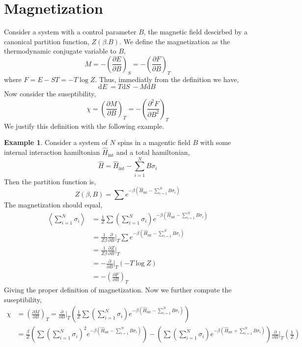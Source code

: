 \documentclass[12pt]{extarticle}
\renewcommand{\d}[1]{ \mathrm{d}#1 \:}
\newcommand{\pderiv}[2]{\frac{\partial{#1}}{\partial{#2}}}
\theoremstyle{definition}
\newtheorem{example}[theorem]{Example}
\begin{document}
\section{Magnetization}

Consider a system with a control parameter $B$, the magnetic field descirbed by a canonical partition function, $Z(\beta. B)$. We define the magnetization as the thermodynamic conjugate variable to $B$,
\[ M = - \left( \pderiv{E}{B} \right)_S = - \left( \pderiv{F}{B} \right)_T \]
where $F = E - ST = - T \log{Z}$. Thus, immediatly from the definition we have,
\[ \d{E} = T \d{S} - M \d{B} \]
Now consider the suseptibility, 
\[ \chi = \left( \pderiv{M}{B} \right)_T = - \left( \frac{\partial^2 F}{\partial B^2} \right)_T \]
We justify this definition with the following example.

\begin{example}
Consider a system of $N$ spins in a magentic field $B$ with some internal interaction hamiltonian $\hat{H}_{\text{int}}$ and a total hamiltonian,
\[ \hat{H} = \hat{H}_{\text{int}} - \sum_{i = 1}^N B \sigma_i \]
Then the partition function is,
\[ Z(\beta, B) = \sum e^{- \beta (\hat{H}_{\text{int}} - \sum\limits_{i = 1}^N B \sigma_i) } \]
The magnetization should equal,
\begin{align*}
\left< \sum_{i = 1}^N \sigma_i \right> & = \frac{1}{Z} \sum \left( \sum_{i = 1}^N \sigma_i \right) e^{- \beta (\hat{H}_{\text{int}} - \sum\limits_{i = 1}^N B \sigma_i) }
\\
& = \frac{1}{Z \beta} \pderiv{}{B} \bigg|_T \sum e^{- \beta (\hat{H}_{\text{int}} - \sum\limits_{i = 1}^N B \sigma_i) }
\\
& = \frac{1}{Z \beta} \pderiv{Z}{B} \bigg|_T
\\
& = - \pderiv{}{B} \bigg|_T (- T \log{Z} )
\\
& = - \left( \pderiv{F}{B} \right)_T
\end{align*}
Giving the proper definition of magnetization. Now we further compute the suseptibility,
\begin{align*}
\chi & = \left( \pderiv{M}{B} \right)_T = \pderiv{}{B} \bigg|_T \left( \frac{1}{Z} \sum \left( \sum_{i = 1}^N \sigma_i \right) e^{- \beta (\hat{H}_{\text{int}} - \sum\limits_{i = 1}^N B \sigma_i) } \right)
\\
& = \frac{\beta}{Z} \left( \sum \left( \sum_{i = 1}^N \sigma_i \right)^2 e^{- \beta (\hat{H}_{\text{int}} - \sum\limits_{i = 1}^N B \sigma_i) } \right) - \left( \sum \left( \sum_{i = 1}^N \sigma_i \right) e^{- \beta (\hat{H}_{\text{int}} + \sum\limits_{i = 1}^N B \sigma_i) } \right) \pderiv{}{B} \bigg|_T  \left( \frac{1}{Z} \right) 

\end{align*}
\end{example}
\end{document}
